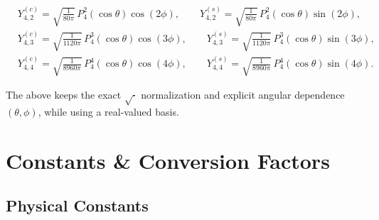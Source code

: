 \begin{align*}
                                    &Y_{4,2}^{(c)}=\sqrt{\frac{1}{80\pi}}\,P_4^2(\cos\theta)\cos(2\phi),\qquad
                                     Y_{4,2}^{(s)}=\sqrt{\frac{1}{80\pi}}\,P_4^2(\cos\theta)\sin(2\phi),\\
                                    &Y_{4,3}^{(c)}=\sqrt{\frac{1}{1120\pi}}\,P_4^3(\cos\theta)\cos(3\phi),\qquad
                                     Y_{4,3}^{(s)}=\sqrt{\frac{1}{1120\pi}}\,P_4^3(\cos\theta)\sin(3\phi),\\
                                    &Y_{4,4}^{(c)}=\sqrt{\frac{1}{8960\pi}}\,P_4^4(\cos\theta)\cos(4\phi),\qquad
                                     Y_{4,4}^{(s)}=\sqrt{\frac{1}{8960\pi}}\,P_4^4(\cos\theta)\sin(4\phi).
\end{align*}

\bigskip
\noindent
The above keeps the exact $\sqrt{\cdot}$ normalization and explicit angular dependence
$(\theta,\phi)$, while using a real-valued basis.
\clearpage





\chapter{Constants \& Conversion Factors}

\section{Physical Constants}

